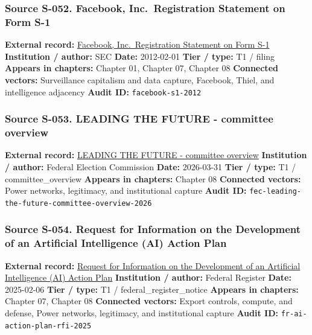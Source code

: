 \documentclass[
  american,
  11pt,
  letterpaper,
]{article}
\begin{document}
\subsubsection{Source S-052. Facebook, Inc.~Registration Statement on
Form
S-1}\label{source-s-052-facebook-inc-registration-statement-on-form-s-1}

\textbf{External record:}
\href{https://www.sec.gov/Archives/edgar/data/1326801/000119312512034517/d287954ds1.htm}{Facebook,
Inc.~Registration Statement on Form S-1} \textbf{Institution / author:}
SEC \textbf{Date:} 2012-02-01 \textbf{Tier / type:} T1 / filing
\textbf{Appears in chapters:} Chapter 01, Chapter 07, Chapter 08
\textbf{Connected vectors:} Surveillance capitalism and data capture,
Facebook, Thiel, and intelligence adjacency \textbf{Audit ID:}
\texttt{facebook-s1-2012}

\subsubsection{Source S-053. LEADING THE FUTURE - committee
overview}\label{source-s-053-leading-the-future-committee-overview}

\textbf{External record:}
\href{https://www.fec.gov/data/committee/C00916114/}{LEADING THE FUTURE
- committee overview} \textbf{Institution / author:} Federal Election
Commission \textbf{Date:} 2026-03-31 \textbf{Tier / type:} T1 /
committee\_overview \textbf{Appears in chapters:} Chapter 08
\textbf{Connected vectors:} Power networks, legitimacy, and
institutional capture \textbf{Audit ID:}
\texttt{fec-leading-the-future-committee-overview-2026}

\subsubsection{Source S-054. Request for Information on the Development
of an Artificial Intelligence (AI) Action
Plan}\label{source-s-054-request-for-information-on-the-development-of-an-artificial-intelligence-ai-action-plan}

\textbf{External record:}
\href{https://www.federalregister.gov/documents/2025/02/06/2025-02305/request-for-information-on-the-development-of-an-artificial-intelligence-ai-action-plan}{Request
for Information on the Development of an Artificial Intelligence (AI)
Action Plan} \textbf{Institution / author:} Federal Register
\textbf{Date:} 2025-02-06 \textbf{Tier / type:} T1 /
federal\_register\_notice \textbf{Appears in chapters:} Chapter 07,
Chapter 08 \textbf{Connected vectors:} Export controls, compute, and
defense, Power networks, legitimacy, and institutional capture
\textbf{Audit ID:} \texttt{fr-ai-action-plan-rfi-2025}
\end{document}
